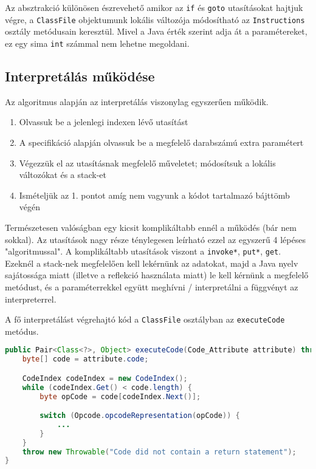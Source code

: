 Az absztrakció különösen észrevehető amikor az \lstinline{if} és \lstinline{goto} utasításokat hajtjuk végre, a \lstinline{ClassFile} objektumunk lokális változója módosítható az \lstinline{Instructions} osztály metódusain keresztül. Mivel a Java érték szerint adja át a paramétereket, ez egy sima \lstinline{int} számmal nem lehetne megoldani.

\subsection{Interpretálás működése}

Az algoritmus alapján az interpretálás viszonylag egyszerűen működik.
\begin{enumerate}
	\item Olvassuk be a jelenlegi indexen lévő utasítást
	\item A specifikáció alapján olvassuk be a megfelelő darabszámú extra paramétert
	\item Végezzük el az utasításnak megfelelő műveletet; módosítsuk a lokális változókat és a stack-et
	\item Ismételjük az 1. pontot amíg nem vagyunk a kódot tartalmazó bájttömb végén
\end{enumerate}

Természetesen valóságban egy kicsit komplikáltabb ennél a működés (bár nem sokkal). Az utasítások nagy része ténylegesen leírható ezzel az egyszerű 4 lépéses "algoritmussal". A komplikáltabb utasítások viszont a \lstinline{invoke*}, \lstinline{put*}, \lstinline{get}. Ezeknél a stack-nek megfelelően kell lekérnünk az adatokat, majd a Java nyelv sajátossága miatt (illetve a reflekció használata miatt) le kell kérnünk a megfelelő metódust, és a paraméterrekkel együtt meghívni / interpretálni a függvényt az interpreterrel.

A fő interpretálást végrehajtó kód a \lstinline{ClassFile} osztályban az \lstinline{executeCode} metódus.

\begin{lstlisting}[language={Java}]
public Pair<Class<?>, Object> executeCode(Code_Attribute attribute) throws Throwable {
	byte[] code = attribute.code;

	CodeIndex codeIndex = new CodeIndex();
	while (codeIndex.Get() < code.length) {
		byte opCode = code[codeIndex.Next()];

		switch (Opcode.opcodeRepresentation(opCode)) {
			...
		}
	}
	throw new Throwable("Code did not contain a return statement");
}
\end{lstlisting}

